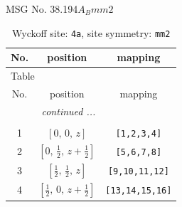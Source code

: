 \documentclass[fleqn,8pt]{jsarticle}
\begin{document}
\setcounter{MaxMatrixCols}{32}

\renewcommand{\tablename}{Table~}
\renewcommand{\figurename}{Figure~}
\begin{center}
\LARGE
MSG No. 38.194\quad$A_{B}mm2$
\end{center}
\renewcommand{\arraystretch}{1.2}
\begin{longtable}{ccc}
\caption{Wyckoff site: {\tt 4a}, site symmetry: {\tt mm2}}
 \\
 \hline \hline
No. & position & mapping \\ \hline \endfirsthead

\multicolumn{2}{l}{\tablename\ \thetable{}} \\
 \hline \hline
No. & position & mapping \\ \hline \endhead

 \hline \hline
\multicolumn{2}{r}{\footnotesize\it continued ...} \\ \endfoot

 \hline \hline
\multicolumn{2}{r}{} \\ \endlastfoot

1 & $\left[ 0,\, 0,\, z \right]$ & {\tt [1,2,3,4]} \\ \hline
2 & $\left[ 0,\, \frac{1}{2},\, z + \frac{1}{2} \right]$ & {\tt [5,6,7,8]} \\ \hline
3 & $\left[ \frac{1}{2},\, \frac{1}{2},\, z \right]$ & {\tt [9,10,11,12]} \\ \hline
4 & $\left[ \frac{1}{2},\, 0,\, z + \frac{1}{2} \right]$ & {\tt [13,14,15,16]} \\
\end{longtable}
\renewcommand{\arraystretch}{1.2}
\end{document}
